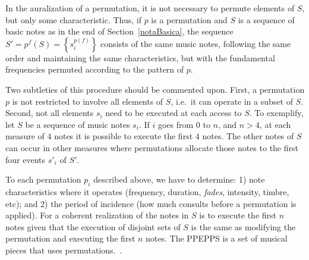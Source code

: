 In the auralization of a permutation, it is not necessary to permute elements of $S$,
but only some characteristic. Thus, if $p$ is a permutation and $S$ is a sequence of basic notes as in the end of Section~\ref{notaBasica}, the
sequence $S'=p^f(S)=\left\{s_i^{p(f)}\right\}$ consists of the same
music notes, following the same order and maintaining the same characteristics, but with the
fundamental frequencies permuted according to the pattern of $p$.

Two subtleties of this procedure should be commented upon. 
First, a permutation $p$ is not restricted to involve all elements of $S$, i.e.\ it can operate in a subset of $S$.
Second, not all elements $s_i$ need to be executed at each access to $S$. To exemplify, let $S$ be a sequence of music notes $s_i$. 
If $i$ goes from $0$ to $n$, and
$n>4$, at each measure of $4$ notes it is possible to execute the first $4$
notes.
The other notes of $S$ can occur in other measures where permutations 
allocate those notes to the first four events $s'_i$ of $S'$.

To each permutation $p_i$ described above, we have to determine:
1) note characteristics where it operates (frequency, duration, \emph{fades},
intensity, timbre, etc); and
2) the period of incidence (how much consults before a permutation is
applied).
For a coherent realization of the notes in $S$ is to
execute the first $n$ notes given that the execution of disjoint sets of $S$
is the same as modifying the permutation and executing the first $n$ notes.
The PPEPPS is a set of musical pieces that uses permutations.~\cite{MASSA,figgusOriginal,figgusEspacializacao}.

